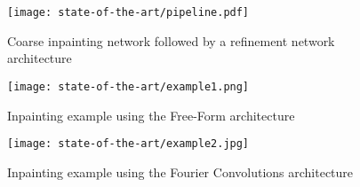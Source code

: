 \begin{figure}[ht]
    \centering
    \texttt{[image: state-of-the-art/pipeline.pdf]}
    \caption[Coarse inpainting network followed by a refinement network architecture]{Coarse inpainting network followed by a refinement network architecture~\supercite{free-form-inpainting}}
    \label{fig:pipeline}
\end{figure}

\begin{figure}[ht]
    \centering
    \texttt{[image: state-of-the-art/example1.png]}
    \caption[Inpainting example using the Free-Form architecture]{Inpainting example using the Free-Form architecture\supercite{free-form-inpainting}}
    \label{fig:example1}
\end{figure}

\begin{figure}[ht]
    \centering
    \texttt{[image: state-of-the-art/example2.jpg]}
    \caption[Inpainting example using the Fourier Convolutions architecture]{Inpainting example using the Fourier Convolutions architecture~\supercite{fourier-conv}}
    \label{fig:example2}
\end{figure}
